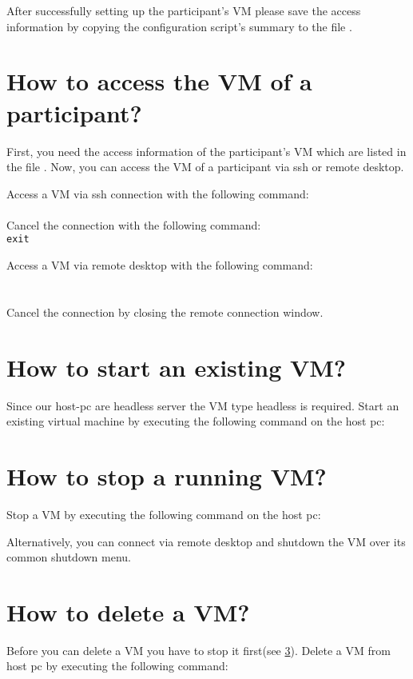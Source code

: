 After successfully setting up the participant's VM please save the access information by copying the configuration script's summary to the file \notes.


\section{How to access the VM of a participant?}\label{access}
First, you need the access information of the participant's VM which are listed in the file \notes.
Now, you can access the VM of a participant via ssh or remote desktop. 
\medskip\noindent

Access a VM via ssh connection with the following command:\\
\\
Cancel the connection with the following command:\\
\texttt{exit}
\medskip\noindent

Access a VM via remote desktop with the following command:\\
\\\\
Cancel the connection by closing the remote connection window.


\section{How to start an existing VM?}\label{start}
Since our host-pc are headless server the VM type headless is required. Start an existing virtual machine by executing the following command on the host pc:\\


\section{How to stop a running VM?}\label{stop}
Stop a VM by executing the following command on the host pc:\\
\medskip\noindent

Alternatively, you can connect via remote desktop and shutdown the VM over its common shutdown menu.

\section{How to delete a VM?}
Before you can delete a VM you have to stop it first(see \ref{stop}). Delete a VM from host pc by executing the following command:\\

